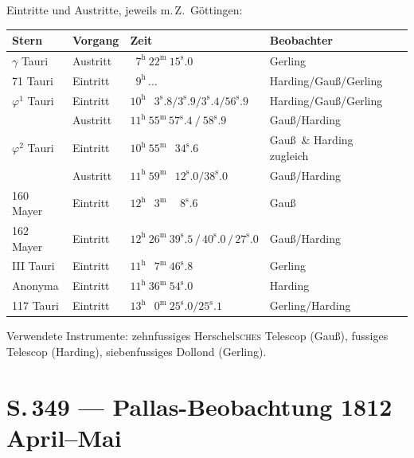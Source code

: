 \documentclass[11pt,a4paper]{article}
\newcommand{\h}{^{\mathrm{h}}}
\newcommand{\m}{^{\mathrm{m}}}
\newcommand{\sdec}[1]{^{\mathrm{s}}\!.#1}          %
\newcommand{\mZ}{m.\,Z.}                            %
\begin{document}
Eintritte und Austritte, jeweils \mZ\ G\"ottingen:
\begin{center}
\begin{tabular}{l l l l l}
\toprule
Stern              & Vorgang   & Zeit                                               & Beobachter \\
\midrule
$\gamma$ Tauri       & Austritt  & $\phantom{0}7\h\ 22\m\ 15\sdec{0}$  & Gerling  \\
71 Tauri             & Eintritt  & $\phantom{0}9\h\,\ldots$                          & Harding/Gau\ss/Gerling \\
$\varphi^1$ Tauri    & Eintritt  & $10\h\ \phantom{0}3\sdec{8}/3\sdec{9}/3\sdec{4}/56\sdec{9}$ & Harding/Gau\ss/Gerling \\
                     & Austritt  & $11\h\ 55\m\,57\sdec{4}\ /\ 58\sdec{9}$            & Gau\ss/Harding \\
$\varphi^2$ Tauri    & Eintritt  & $10\h\ 55\m\ \phantom{0}34\sdec{6}$               & Gau\ss\ \& Harding zugleich \\
                     & Austritt  & $11\h\ 59\m\ \phantom{0}12\sdec{0}/38\sdec{0}$    & Gau\ss/Harding \\
160 Mayer            & Eintritt  & $12\h\ \phantom{0}3\m\,\phantom{00}8\sdec{6}$     & Gau\ss\ \\
162 Mayer            & Eintritt  & $12\h\ 26\m\ 39\sdec{5}\,/\,40\sdec{0}\,/\,27\sdec{0}$ & Gau\ss/Harding \\
III Tauri            & Eintritt  & $11\h\ \phantom{0}7\m\ 46\sdec{8}$                & Gerling \\
Anonyma              & Eintritt  & $11\h\ 36\m\ 54\sdec{0}$                          & Harding \\
117 Tauri            & Eintritt  & $13\h\ \phantom{0}0\m\ 25\sdec{0}/25\sdec{1}$     & Gerling/Harding \\
\bottomrule
\end{tabular}
\end{center}

\noindent
Verwendete Instrumente: zehnfussiges Herschel\textsc{sches} Telescop (Gau\ss),
fussiges Telescop (Harding), siebenfussiges Dollond (Gerling).

\section*{S.\,349 --- Pallas-Beobachtung 1812 April--Mai}
\end{document}
